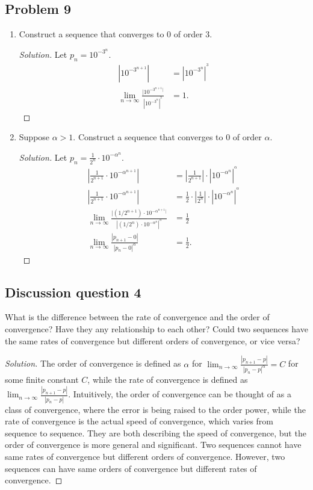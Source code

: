 \documentclass{article}
\begin{document}
\subsection*{Problem 9}
\begin{enumerate}[label=\alph*.]
    \item Construct a sequence that converges to 0 of order 3.
    \begin{proof}[Solution]
        Let $p_n = 10^{-3^n}$.
        \begin{align*}
            |10^{-3^{n+1}}| & = |10^{-3^n}|^{^3} \\
            \lim_{n\rightarrow\infty}\frac{|10^{-3^{n+1}|}}{|10^{-3^n}|^{^3}} & = 1.
        \end{align*}
    \end{proof}
    \item Suppose $\alpha > 1$. Construct a sequence that converges to 0 of order $\alpha$.
    \begin{proof}[Solution]
        Let $p_n = \frac{1}{2^n}\cdot10^{-\alpha^n}$.
        \begin{align*}
            |\frac{1}{2^{n+1}}\cdot10^{-\alpha^{n+1}}| & = |\frac{1}{2^{n+1}}|\cdot|10^{-\alpha^n}|^{^\alpha} \\
            |\frac{1}{2^{n+1}}\cdot10^{-\alpha^{n+1}}| & = \frac{1}{2}\cdot|\frac{1}{2^n}|\cdot|10^{-\alpha^n}|^{^\alpha} \\
            \lim_{n\rightarrow\infty}\frac{|(1/2^{n+1})\cdot10^{-\alpha^{n+1}|}}{|(1/2^n)\cdot10^{-\alpha^n}|^{^\alpha}} & = \frac{1}{2} \\
            \lim_{n\rightarrow\infty}\frac{|p_{n+1}-0|}{|p_n-0|^\alpha} & = \frac{1}{2}.
        \end{align*}
    \end{proof}
\end{enumerate}

\subsection*{Discussion question 4}
What is the difference between the rate of convergence and the order of convergence? Have they any 
relationship to each other? Could two sequences have the same rates of convergence but different 
orders of convergence, or vice versa?
\begin{proof}[Solution]
    The order of convergence is defined as $\alpha$ for $\lim_{n\rightarrow\infty}\frac{|p_{n+1}-p|}
    {|p_n-p|^\alpha} = C$ for some finite constant $C$, while the rate of convergence is defined as 
    $\lim_{n\rightarrow\infty}\frac{|p_{n+1}-p|}{|p_n-p|}$. Intuitively, the order of convergence 
    can be thought of as a class of convergence, where the error is being raised to the order power, 
    while the rate of convergence is the actual speed of convergence, which varies from sequence to 
    sequence. They are both describing the speed of convergence, but the order of convergence is 
    more general and significant. Two sequences cannot have same rates of convergence but different 
    orders of convergence. However, two sequences can have same orders of convergence but different 
    rates of convergence.
\end{proof}
\end{document}
